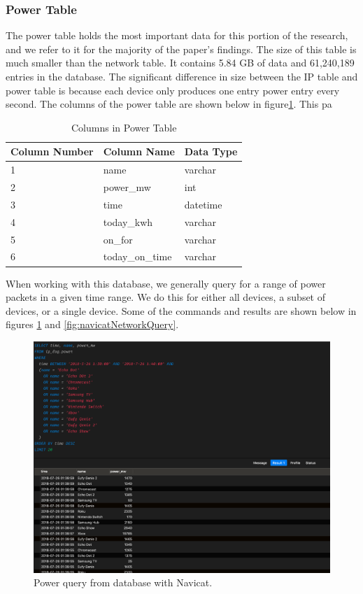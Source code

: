 \subsubsection{Power Table}

The power table holds the most important data for this portion of the research, and we refer to it for the majority of the paper's findings. The size of this table is much smaller than the network table. It contains 5.84 GB of data and 61,240,189 entries in the database. The significant difference in size between the IP table and power table is because each device only produces one entry power entry every second. The columns of the power table are shown below in figure\ref{tab:powcol}. This pa

\begin{table}[H]
    \centering
    \caption{Columns in Power Table}
    \begin{tabular}{@{}lll@{}}
    \toprule
    Column Number & Column Name     & Data Type \\ \midrule
    1             & name            & varchar   \\
    2             & power\_mw       & int       \\
    3             & time            & datetime  \\
    4             & today\_kwh      & varchar   \\
    5             & on\_for         & varchar   \\
    6             & today\_on\_time & varchar
    \end{tabular}
    \label{tab:powcol}
    \end{table}

When working with this database, we generally query for a range of power packets in a given time range. We do this for either all devices, a subset of devices, or a single device. Some of the commands and results are shown below in figures \ref{fig:navicatPowerQuery} and \ref{fig:navicatNetworkQuery}.

\begin{figure}[H]
    \centering
    \includegraphics[width=1\textwidth]{figures/navicatPowerQuery.png}
    \caption{Power query from database with Navicat.}
    \label{fig:navicatPowerQuery}
\end{figure}


